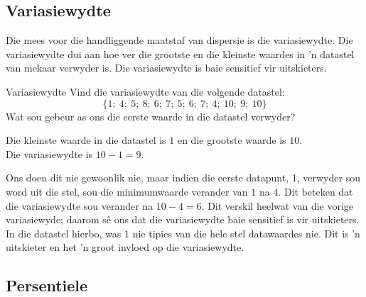 \subsection{Variasiewydte}

Die mees voor die handliggende  maatstaf van dispersie is die variasiewydte. Die variasiewydte dui aan hoe ver die grootste en die kleinste waardes in ’n datastel van mekaar verwyder is. Die variasiewydte is baie sensitief vir uitskieters.

\begin{wex}{Variasiewydte}
{Vind die variasiewydte van die volgende datastel:
    \begin{equation*}
      \{1;\ 4;\ 5;\ 8;\ 6;\ 7;\ 5;\ 6;\ 7;\ 4;\ 10;\ 9;\ 10\}
    \end{equation*}
    Wat sou gebeur as ons die eerste waarde in die datastel verwyder?
}{
  Die kleinste waarde in die datastel is $1$ en die grootste waarde is $10$.\\
  Die variasiewydte is $10-1=9$.

  Ons doen dit nie gewoonlik nie, maar indien die eerste datapunt, 1, verwyder sou word uit die stel, sou die minimumwaarde verander van $1$ na $4$. Dit beteken dat die variasiewydte sou verander na $10- 4 = 6$. Dit verskil heelwat van die vorige variasiewyde; daarom sê ons dat die variasiewydte baie sensitief is vir uitskieters. In die datastel hierbo, was $1$ nie tipies van die hele stel datawaardes nie. Dit is ’n uitskieter en het ’n groot invloed op die variasiewydte. 
}
\end{wex}


\subsection{Persentiele}


